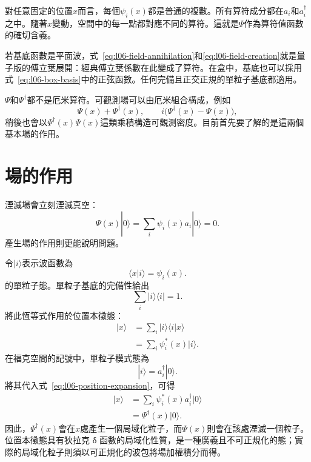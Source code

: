 對任意固定的位置\(x\)而言，每個\(\psi_i(x)\)都是普通的複數。所有算符成分都在\(a_i\)和\(a_i^\dagger\)之中。隨著\(x\)變動，空間中的每一點都對應不同的算符。這就是\(\Psi\)作為算符值函數的確切含義。

若基底函數是平面波，式~\eqref{eq:l06-field-annihilation}和\eqref{eq:l06-field-creation}就是量子版的傅立葉展開：經典傅立葉係數在此變成了算符。在盒中，基底也可以採用式~\eqref{eq:l06-box-basis}中的正弦函數。任何完備且正交正規的單粒子基底都適用。

\(\Psi\)和\(\Psi^\dagger\)都不是厄米算符。可觀測場可以由厄米組合構成，例如
\begin{equation}
\Psi(x)+\Psi^\dagger(x),
\qquad
i\bigl(\Psi^\dagger(x)-\Psi(x)\bigr),
\end{equation}
稍後也會以\(\Psi^\dagger(x)\Psi(x)\)這類乘積構造可觀測密度。目前首先要了解的是這兩個基本場的作用。

\begin{classroomqa}
\end{classroomqa}

\section{場的作用}

湮滅場會立刻湮滅真空：
\begin{equation}
\Psi(x)|0\rangle
=\sum_i\psi_i(x)a_i|0\rangle
=0.
\label{eq:l06-field-kills-vacuum}
\end{equation}
產生場的作用則更能說明問題。

令\(|i\rangle\)表示波函數為
\begin{equation}
\langle x|i\rangle=\psi_i(x).
\end{equation}
的單粒子態。單粒子基底的完備性給出
\begin{equation}
\sum_i|i\rangle\langle i|=1.
\label{eq:l06-completeness}
\end{equation}
將此恆等式作用於位置本徵態：
\begin{align}
|x\rangle
&=\sum_i|i\rangle\langle i|x\rangle \\
&=\sum_i\psi_i^*(x)|i\rangle.
\label{eq:l06-position-expansion}
\end{align}
在福克空間的記號中，單粒子模式態為
\begin{equation}
|i\rangle=a_i^\dagger|0\rangle.
\end{equation}
將其代入式~\eqref{eq:l06-position-expansion}，可得
\begin{align}
|x\rangle
&=\sum_i\psi_i^*(x)a_i^\dagger|0\rangle \\
&=\Psi^\dagger(x)|0\rangle.
\label{eq:l06-local-creation}
\end{align}
因此，\(\Psi^\dagger(x)\)會在\(x\)處產生一個局域化粒子，而\(\Psi(x)\)則會在該處湮滅一個粒子。位置本徵態具有狄拉克 {\proseunicodefont δ} 函數的局域化性質，是一種廣義且不可正規化的態；實際的局域化粒子則須以可正規化的波包將場加權積分而得。

